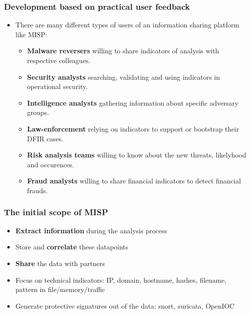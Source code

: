 \begin{frame}
  \frametitle{Development based on practical user feedback}
  \begin{itemize}
    \item There are many different types of users of an information sharing platform like MISP:
    \begin{itemize}
      \item {\bf Malware reversers} willing to share indicators of analysis with respective colleagues.
      \item {\bf Security analysts} searching, validating and using indicators in operational security.
      \item {\bf Intelligence analysts} gathering information about specific adversary groups.
      \item {\bf Law-enforcement} relying on indicators to support or bootstrap their DFIR cases.
      \item {\bf Risk analysis teams} willing to know about the new threats, likelyhood and occurences.
      \item {\bf Fraud analysts} willing to share financial indicators to detect financial frauds.
    \end{itemize}
  \end{itemize}
\end{frame}

\begin{frame}
  \frametitle{The initial scope of MISP}
  \begin{itemize}
    \item {\bf Extract information} during the analysis process
    \item Store and {\bf correlate} these datapoints
    \item {\bf Share} the data with partners
    \item Focus on technical indicators: IP, domain, hostname, hashes, filename, pattern in file/memory/traffic
    \item Generate protective signatures out of the data: snort, suricata, OpenIOC
  \end{itemize}
\end{frame}


